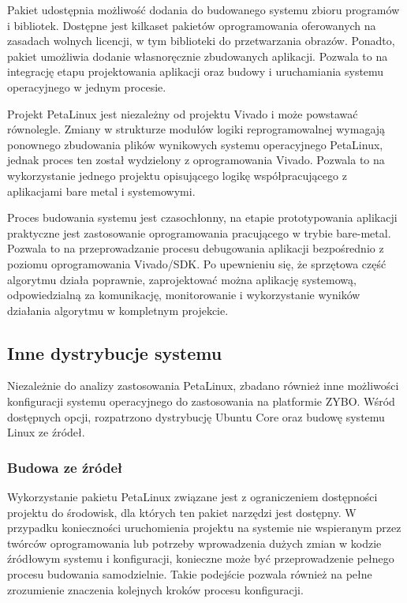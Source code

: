 Pakiet udostępnia możliwość dodania do budowanego systemu zbioru programów i bibliotek. 
Dostępne jest kilkaset pakietów oprogramowania oferowanych na zasadach wolnych licencji, w tym biblioteki do przetwarzania obrazów. %
Ponadto, pakiet umożliwia dodanie własnoręcznie zbudowanych aplikacji. 
Pozwala to na integrację etapu projektowania aplikacji oraz budowy i uruchamiania systemu operacyjnego w jednym procesie.

Projekt PetaLinux jest niezależny od projektu Vivado i może powstawać równolegle. 
Zmiany w strukturze modułów logiki reprogramowalnej wymagają ponownego zbudowania plików wynikowych systemu operacyjnego PetaLinux, jednak proces ten został wydzielony z oprogramowania Vivado. %
Pozwala to na wykorzystanie jednego projektu opisującego logikę współpracującego z aplikacjami bare metal i systemowymi. 

Proces budowania systemu jest czasochłonny, na etapie prototypowania aplikacji praktyczne jest zastosowanie oprogramowania pracującego w trybie bare-metal. %
Pozwala to na przeprowadzanie procesu debugowania aplikacji bezpośrednio z poziomu oprogramowania Vivado/SDK. 
Po upewnieniu się, że sprzętowa część algorytmu działa poprawnie, zaprojektować można aplikację systemową, odpowiedzialną za komunikację, monitorowanie i wykorzystanie wyników działania algorytmu w kompletnym projekcie.

\subsection{Inne dystrybucje systemu}
Niezależnie do analizy zastosowania PetaLinux, zbadano również inne możliwości konfiguracji systemu operacyjnego do zastosowania na platformie ZYBO. 
Wśród dostępnych opcji, rozpatrzono dystrybucję Ubuntu Core oraz budowę systemu Linux ze źródeł.

\subsubsection{Budowa ze źródeł}
Wykorzystanie pakietu PetaLinux związane jest z ograniczeniem dostępności projektu do środowisk, dla których ten pakiet narzędzi jest dostępny. 
W przypadku konieczności uruchomienia projektu na systemie nie wspieranym przez twórców oprogramowania lub potrzeby wprowadzenia dużych zmian w kodzie źródłowym systemu i konfiguracji, konieczne może być przeprowadzenie pełnego procesu budowania samodzielnie. 
Takie podejście pozwala również na pełne zrozumienie znaczenia kolejnych kroków procesu konfiguracji.

